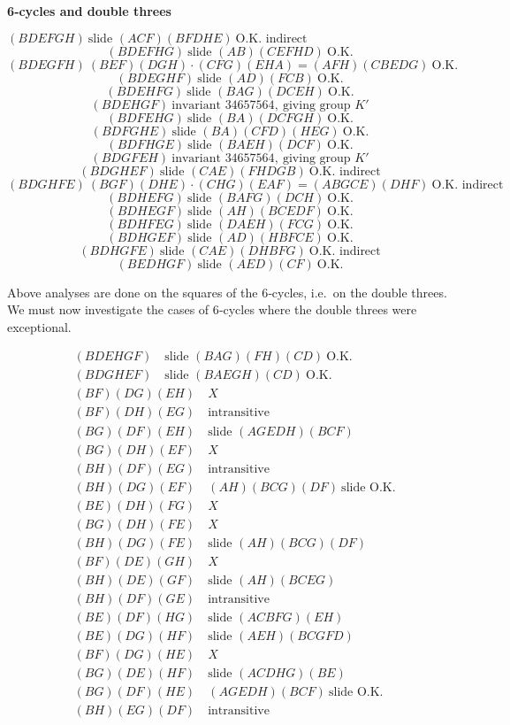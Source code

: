 \documentclass[12pt]{article}
\begin{document}
\medskip

\noindent
{\bf 6‐cycles and double threes}

\smallskip

\noindent
\(
(BDEFGH)\ \text{slide }(ACF)(BFDHE)\ \text{O.K.\ indirect}
\)
\[
(BDEFHG)\ \text{slide }(AB)(CEFHD)\ \text{O.K.}
\]
\[
(BDEGFH)\ (BEF)(DGH)\cdot(CFG)(EHA) = (AFH)(CBEDG)\ \text{O.K.}
\]
\[
(BDEGHF)\ \text{slide }(AD)(FCB)\ \text{O.K.}
\]
\[
(BDEHFG)\ \text{slide }(BAG)(DCEH)\ \text{O.K.}
\]
\[
(BDEHGF)\ \text{invariant }34657564,\ \text{giving group }K'
\]
\[
(BDFEHG)\ \text{slide }(BA)(DCFGH)\ \text{O.K.}
\]
\[
(BDFGHE)\ \text{slide }(BA)(CFD)(HEG)\ \text{O.K.}
\]
\[
(BDFHGE)\ \text{slide }(BAEH)(DCF)\ \text{O.K.}
\]
\[
(BDGFEH)\ \text{invariant }34657564,\ \text{giving group }K'
\]
\[
(BDGHEF)\ \text{slide }(CAE)(FHDGB)\ \text{O.K. indirect}
\]
\[
(BDGHFE)\ (BGF)(DHE)\cdot(CHG)(EAF) = (\!ABGCE)(DHF)\ \text{O.K. indirect}
\]
\[
(BDHEFG)\ \text{slide }(BAFG)(DCH)\ \text{O.K.}
\]
\[
(BDHEGF)\ \text{slide }(AH)(BCEDF)\ \text{O.K.}
\]
\[
(BDHFEG)\ \text{slide }(DAEH)(FCG)\ \text{O.K.}
\]
\[
(BDHGEF)\ \text{slide }(AD)(HBFCE)\ \text{O.K.}
\]
\[
(BDHGFE)\ \text{slide }(CAE)(DHBFG)\ \text{O.K. indirect}
\]
\[
(BEDHGF)\ \text{slide }(AED)(CF)\ \text{O.K.}
\]

Above analyses are done on the squares of the 6‐cycles, i.e.\ on the double threes. We must now investigate the cases of 6‐cycles where the double threes were exceptional.

\[
\begin{aligned}
&(BDEHGF) \quad \text{slide }(BAG)(FH)(CD)\ \text{O.K.}\\
&(BDGHEF) \quad \text{slide }(BAEGH)(CD)\ \text{O.K.}\\
&(BF)(DG)(EH) \quad X \\
&(BF)(DH)(EG) \quad \text{intransitive}\\
&(BG)(DF)(EH) \quad \text{slide }(AGEDH)(BCF)\\
&(BG)(DH)(EF) \quad X\\
&(BH)(DF)(EG) \quad \text{intransitive}\\
&(BH)(DG)(EF) \quad (AH)(BCG)(DF)\ \text{slide O.K.}\\
&(BE)(DH)(FG) \quad X\\
&(BG)(DH)(FE) \quad X\\
&(BH)(DG)(FE) \quad \text{slide }(AH)(BCG)(DF)\\
&(BF)(DE)(GH) \quad X\\
&(BH)(DE)(GF) \quad \text{slide }(AH)(BCEG)\\
&(BH)(DF)(GE) \quad \text{intransitive}\\
&(BE)(DF)(HG) \quad \text{slide }(ACBFG)(EH)\\
&(BE)(DG)(HF) \quad \text{slide }(AEH)(BCGFD)\\
&(BF)(DG)(HE) \quad X\\
&(BG)(DE)(HF) \quad \text{slide }(ACDHG)(BE)\\
&(BG)(DF)(HE) \quad (AGEDH)(BCF)\ \text{slide O.K.}\\
&(BH)(EG)(DF) \quad \text{intransitive}
\end{aligned}
\]
\end{document}
